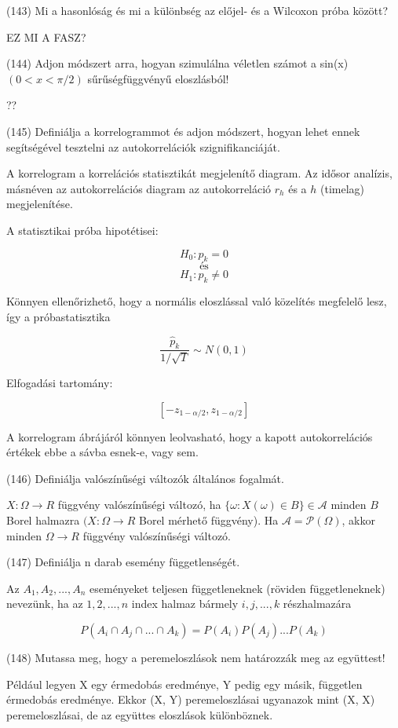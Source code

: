\documentclass[12p]{article}
\begin{document}
(143) Mi a hasonlóság és mi a különbség az előjel- és a Wilcoxon próba között?

EZ MI A FASZ?

(144) Adjon módszert arra, hogyan szimulálna véletlen számot a sin(x) $(0 < x < \pi/2)$ sűrűségfüggvényű eloszlásból!

??

(145) Definiálja a korrelogrammot és adjon módszert, hogyan lehet ennek segítségével tesztelni
az autokorrelációk szignifikanciáját.

A korrelogram a korrelációs statisztikát megjelenítő diagram. Az idősor analízis, másnéven az autokorrelációs diagram az autokorreláció $r_h$ és a $h$ (timelag) megjelenítése.

A statisztikai próba hipotétisei:

$$H_0 : p_k = 0$$
\[
	\text{és}
\]
$$H_1 : p_k \neq 0$$

Könnyen ellenőrizhető, hogy a normális eloszlással való közelítés megfelelő
lesz, így a próbastatisztika

$$\frac{\hat{p}_k}{1/\sqrt{T}} \sim N(0,1) $$

Elfogadási tartomány:

$$[-z_{1-\alpha/2},z_{1-\alpha/2}]$$

A korrelogram ábrájáról könnyen leolvasható, hogy a kapott autokorrelációs
értékek ebbe a sávba esnek-e, vagy sem.

(146) Definiálja valószínűségi változók általános fogalmát.

$X : \Omega \rightarrow R$ függvény valószínűségi változó, ha $\{\omega: X(\omega) \in B\} \in \mathscr{A}$ minden $B$ Borel halmazra $(X: \Omega \rightarrow R$ Borel mérhető függvény).
Ha $\mathscr{A} = \mathscr{P}(\Omega)$, akkor minden $\Omega \rightarrow R$ függvény valószínűségi változó.


(147) Definiálja n darab esemény függetlenségét.

Az $A_1,A_2, ..., A_n$ eseményeket teljesen függetleneknek (röviden függetleneknek) nevezünk, ha az ${1, 2, ..., n}$ index halmaz bármely ${i, j, ..., k}$ részhalmazára

$$P(A_i \cap A_j \cap ... \cap A_k) = P(A_i)P(A_j)...P(A_k)$$

(148) Mutassa meg, hogy a peremeloszlások nem határozzák meg az együttest!

Például legyen X egy érmedobás eredménye, Y pedig egy másik, független érmedobás eredménye. Ekkor (X, Y) peremeloszlásai ugyanazok mint (X, X) peremeloszlásai, de az együttes eloszlások különböznek.
\end{document}
